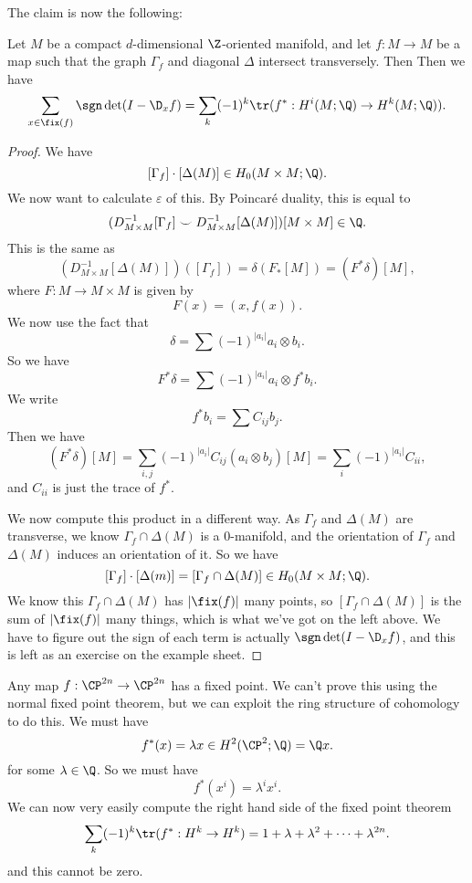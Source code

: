 \documentclass[a4paper]{article}
\begin{document}
The claim is now the following:
\begin{thm}
  Let $M$ be a compact $d$-dimensional $\Z$-oriented manifold, and let $f: M \to M$ be a map such that the graph $\Gamma_f$ and diagonal $\Delta$ intersect transversely. Then
  Then we have
  \[
    \sum_{x \in \fix(f)} \sgn \det(I - \D_x f) = \sum_k (-1)^k \tr(f^*: H^i(M; \Q) \to H^k(M; \Q)).
  \]
\end{thm}
\begin{proof}
  We have
  \[
    [\Gamma_f] \cdot [\Delta (M)] \in H_0(M \times M; \Q).
  \]
  We now want to calculate $\varepsilon$ of this. By Poincar\'e duality, this is equal to
  \[
    (D_{M \times M}^{-1}[\Gamma_f] \smile D_{M \times M}^{-1}[\Delta(M)])[M \times M] \in \Q.
  \]
  This is the same as
  \[
    (D_{M \times M}^{-1} [\Delta(M)]) ([\Gamma_f]) = \delta(F_*[M]) = (F^* \delta)[M],
  \]
  where $F: M \to M \times M$ is given by
  \[
    F(x) = (x, f(x)).
  \]
  We now use the fact that
  \[
    \delta = \sum (-1)^{|a_i|} a_i \otimes b_i.
  \]
  So we have
  \[
    F^* \delta = \sum (-1)^{|a_i|} a_i \otimes f^* b_i.
  \]
  We write
  \[
    f^* b_i = \sum C_{ij} b_j.
  \]
  Then we have
  \[
    (F^* \delta)[M] = \sum_{i, j} (-1)^{|a_i|} C_{ij} (a_i \otimes b_j) [M] = \sum_i (-1)^{|a_i|} C_{ii},
  \]
  and $C_{ii}$ is just the trace of $f^*$.

  We now compute this product in a different way. As $\Gamma_f$ and $\Delta (M)$ are transverse, we know $\Gamma_f \cap \Delta(M)$ is a $0$-manifold, and the orientation of $\Gamma_f$ and $\Delta(M)$ induces an orientation of it. So we have
  \[
    [\Gamma_f] \cdot [\Delta(m)] = [\Gamma_f \cap \Delta(M)] \in H_0(M \times M; \Q).
  \]
  We know this $\Gamma_f \cap \Delta(M)$ has $|\fix(f)|$ many points, so $[\Gamma_f \cap \Delta(M)]$ is the sum of $|\fix(f)|$ many things, which is what we've got on the left above. We have to figure out the sign of each term is actually $\sgn \det(I - \D_x f)$, and this is left as an exercise on the example sheet.
\end{proof}

\begin{eg}
  Any map $f: \CP^{2n} \to \CP^{2n}$ has a fixed point. We can't prove this using the normal fixed point theorem, but we can exploit the ring structure of cohomology to do this. We must have
  \[
    f^*(x) = \lambda x \in H^2(\CP^2; \Q) = \Q x.
  \]
  for some $\lambda \in \Q$. So we must have
  \[
    f^*(x^i) = \lambda^i x^i.
  \]
  We can now very easily compute the right hand side of the fixed point theorem
  \[
    \sum_k (-1)^k \tr(f^*: H^k \to H^k) = 1 + \lambda + \lambda^2 + \cdots + \lambda^{2n}.
  \]
  and this cannot be zero.
\end{eg}

\printindex
\end{document}
